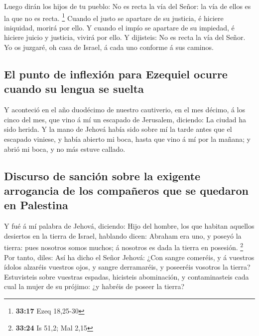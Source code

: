  Luego dirán los hijos de tu pueblo: No es recta la vía del
Señor: la vía de ellos es la que no es recta. \footnote{\textbf{33:17}
  Ezeq 18,25-30}  Cuando el justo se apartare de su
justicia, é hiciere iniquidad, morirá por ello.  Y cuando
el impío se apartare de su impiedad, é hiciere juicio y justicia, vivirá
por ello.  Y dijisteis: No es recta la vía del Señor. Yo os
juzgaré, oh casa de Israel, á cada uno conforme á sus caminos.

\hypertarget{el-punto-de-inflexiuxf3n-para-ezequiel-ocurre-cuando-su-lengua-se-suelta}{%
\subsection{El punto de inflexión para Ezequiel ocurre cuando su lengua
se
suelta}\label{el-punto-de-inflexiuxf3n-para-ezequiel-ocurre-cuando-su-lengua-se-suelta}}

 Y aconteció en el año duodécimo de nuestro cautiverio, en
el mes décimo, á los cinco del mes, que vino á mí un escapado de
Jerusalem, diciendo: La ciudad ha sido herida.  Y la mano
de Jehová había sido sobre mí la tarde antes que el escapado viniese, y
había abierto mi boca, hasta que vino á mí por la mañana; y abrió mi
boca, y no más estuve callado.

\hypertarget{discurso-de-sanciuxf3n-sobre-la-exigente-arrogancia-de-los-compauxf1eros-que-se-quedaron-en-palestina}{%
\subsection{Discurso de sanción sobre la exigente arrogancia de los
compañeros que se quedaron en
Palestina}\label{discurso-de-sanciuxf3n-sobre-la-exigente-arrogancia-de-los-compauxf1eros-que-se-quedaron-en-palestina}}

 Y fué á mí palabra de Jehová, diciendo:  Hijo
del hombre, los que habitan aquellos desiertos en la tierra de Israel,
hablando dicen: Abraham era uno, y poseyó la tierra: pues nosotros somos
muchos; á nosotros es dada la tierra en posesión. \footnote{\textbf{33:24}
  Is 51,2; Mal 2,15}  Por tanto, diles: Así ha dicho el
Señor Jehová: ¿Con sangre comeréis, y á vuestros ídolos alzaréis
vuestros ojos, y sangre derramaréis, y poseeréis vosotros la tierra?
 Estuvisteis sobre vuestras espadas, hicisteis abominación,
y contaminasteis cada cual la mujer de su prójimo: ¿y habréis de poseer
la tierra?

